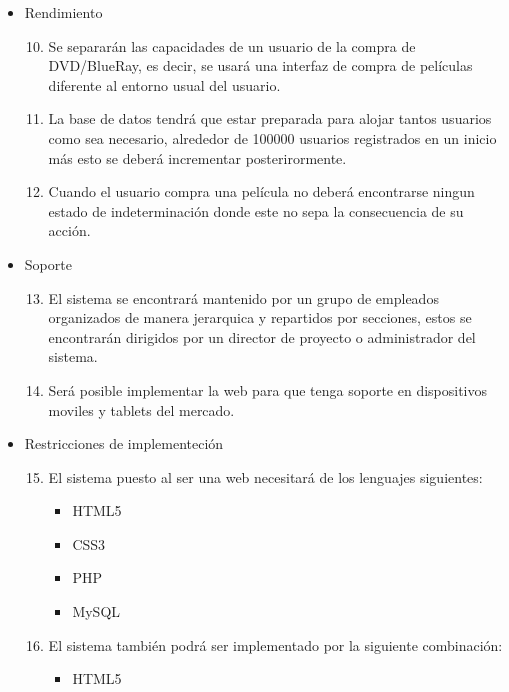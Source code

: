 \documentclass{article}
\begin{document}
\begin{itemize}
\begin{enumerate}[label=\bfseries RN- \arabic*:]
        \end{enumerate}
    \item Rendimiento
        \begin{enumerate}[label=\bfseries RN- \arabic*:]
        \setcounter{enumi}{9}
        \item Se separarán las capacidades de un usuario de la compra de DVD/BlueRay, es decir, se usará una interfaz de compra de películas diferente al entorno usual del usuario.
        \item La base de datos tendrá que estar preparada para alojar tantos usuarios como sea necesario, alrededor de 100000 usuarios registrados en un inicio más esto se deberá incrementar posterirormente.
        \item Cuando el usuario compra una película no deberá encontrarse ningun estado de indeterminación donde este no sepa la consecuencia de su acción.
        \end{enumerate}
    \item Soporte
        \begin{enumerate}[label=\bfseries RN- \arabic*:]
        \setcounter{enumi}{12}
        \item El sistema se encontrará mantenido por un grupo de empleados organizados de manera jerarquica y repartidos por secciones, estos se encontrarán dirigidos por un director de proyecto o administrador del sistema.
        \item Será posible implementar la web para que tenga soporte en dispositivos moviles y tablets del mercado.
        \end{enumerate}
    \item Restricciones de implementeción
        \begin{enumerate}[label=\bfseries RN- \arabic*:]
        \setcounter{enumi}{14}
        \item El sistema puesto al ser una web necesitará de los lenguajes siguientes:
            \begin{itemize}
            \item HTML5
            \item CSS3
            \item PHP
            \item MySQL
            \end{itemize}
        \item El sistema también podrá ser implementado por la siguiente combinación:
            \begin{itemize}
            \item HTML5

\end{itemize}
\end{enumerate}
\end{itemize}
\end{document}
